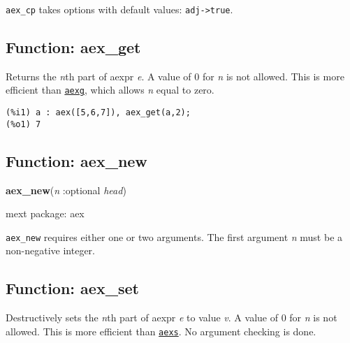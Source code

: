 \documentclass[]{article}
\begin{document}
\vspace{5 pt}

{\tt aex\_cp} takes options with default values: {\tt adj->true}.
\vspace{5 pt}


\subsection{Function: aex\_get\label{sec:aex_get}}
\hypertarget{aex_get}{}



\vspace{5 pt}
Returns the {\it n}th part of aexpr {\it e}. A value of $0$ for {\it n} is not allowed. This is more efficient than \hyperlink{aexg}{{\tt aexg}}, which allows {\it n} equal to zero. 

\vspace{5 pt}


\begin{Verbatim}[frame=single]
(%i1) a : aex([5,6,7]), aex_get(a,2);
(%o1) 7
\end{Verbatim}


\subsection{Function: aex\_new\label{sec:aex_new}}
\hypertarget{aex_new}{}
{\bf aex\_new}({\it n} :optional {\it head})


\noindent mext package: aex



\vspace{5 pt}
   {\tt aex\_new} requires either one or two arguments.
    The first argument {\it n} must be a non-negative integer.


\vspace{5 pt}


\subsection{Function: aex\_set\label{sec:aex_set}}
\hypertarget{aex_set}{}



\vspace{5 pt}
Destructively sets the {\it n}th part of aexpr {\it e} to value {\it v}. A value of $0$ for {\it n} is not allowed. This is more efficient than \hyperlink{aexs}{{\tt aexs}}. No argument checking is done. 
\end{document}
